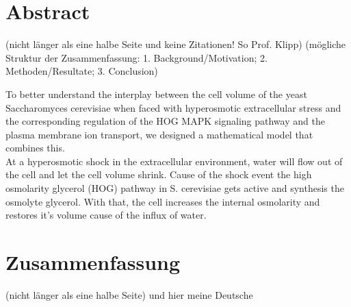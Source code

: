 \section{Abstract}
(nicht länger als eine halbe Seite und keine Zitationen! So Prof. Klipp)
(mögliche Struktur der Zusammenfassung: 1. Background/Motivation; 2. Methoden/Resultate; 3. Conclusion)


To better understand the interplay between the cell volume of the yeast Saccharomyces cerevisiae when faced with hyperosmotic extracellular stress and the corresponding regulation of the HOG MAPK signaling pathway and the plasma membrane ion transport, we designed a mathematical model that combines this.  \\
At a hyperosmotic shock in the extracellular environment, water will flow out of the cell and let the cell volume shrink. Cause of the shock event the high osmolarity glycerol (HOG) pathway in S. cerevisiae gets active and synthesis the osmolyte glycerol. With that, the cell increases the internal osmolarity and restores it’s volume cause of the influx of water.

\section{Zusammenfassung}
(nicht länger als eine halbe Seite)
und hier meine Deutsche
\newpage
